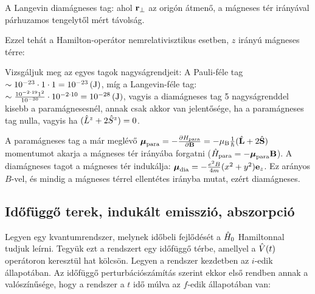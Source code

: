    A Langevin diamágneses tag:
   ahol $\mathbf{r}_\perp$ az origón átmenő, a mágneses tér irányával párhuzamos tengelytől mért távolság. 
   
   Ezzel tehát a Hamilton-operátor nemrelativisztikus esetben, $z$ irányú mágneses térre:
   
   Vizsgáljuk meg az egyes tagok nagyságrendjeit: A Pauli-féle tag $\sim 10^{-23}\cdot 1\cdot 1=10^{-23}\mathrm{\, (J)}$, míg a Langevin-féle tag: $\sim \frac{10^{-2\cdot 19} 1^2}{10^{-30}}\cdot 10^{-2\cdot 10}=10^{-28}\mathrm{\, (J)}$, vagyis a diamágneses tag 5 nagyságrenddel kisebb a paramágnesesnél, annak csak akkor van jelentősége, ha a paramágneses tag nulla, vagyis ha $(\hat{L}^z+2\hat{S}^z)=0$.
   
   A paramágneses tag a már meglévő $\boldsymbol{\mu}_\text{para}=-\frac{\partial H_\text{para}}{\partial \mathbf{B}}=-\mu_\text{B}\frac{1}{\hbar}(\hat{\mathbf{L}}+2\hat{\mathbf{S}})$ momentumot akarja a mágneses tér irányába forgatni ($\hat{H}_\text{para}=-\boldsymbol{\mu}_\text{para}\mathbf{B}$). A diamágneses tagot a mágneses tér indukálja: $\boldsymbol{\mu}_\text{dia}=-\frac{e^2B}{4m}(x^2+y^2)\mathbf{e}_z$. Ez arányos $B$-vel, és mindig a mágneses térrel ellentétes irányba mutat, ezért diamágneses.
   
  \subsection{Időfüggő terek, indukált emisszió, abszorpció}
   
   
   Legyen egy kvantumrendszer, melynek időbeli fejlődését a $\hat{H}_0$ Hamiltonnal tudjuk leírni. Tegyük ezt a rendszert egy időfüggő térbe, amellyel a $\hat{V}(t)$ operátoron keresztül hat kölcsön. Legyen a rendszer kezdetben az $i$-edik állapotában. Az időfüggő perturbációszámítás szerint ekkor első rendben annak a valószínűsége, hogy a rendszer a $t$ idő múlva az $f$-edik állapotában van:
   
